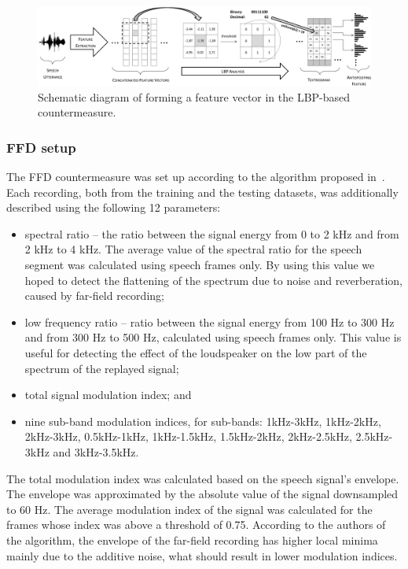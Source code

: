 
\begin{figure}
	\includegraphics[width=1\linewidth]{Figs/LBPfeature.pdf}

	\caption{Schematic diagram of forming a feature vector in the LBP-based countermeasure.}
	\label{fig:LBPfeature}
\end{figure}


\subsubsection{FFD setup} The FFD countermeasure was set up according to the algorithm proposed in~\cite{Villalba2011}. Each recording, both from the training and the testing datasets, was additionally described using the following 12 parameters:
\begin{itemize}
\item spectral ratio -- the ratio between
the signal energy from 0 to 2 kHz and from 2 kHz to 4 kHz.  The average value of the spectral ratio for the speech segment was calculated using speech frames only. By using this value we hoped to detect the flattening of the spectrum due to noise and reverberation, caused by far-field recording;
\item low frequency ratio -- ratio between the signal energy from 100 Hz to 300 Hz and from 300 Hz to 500 Hz, calculated using speech frames only. This value is useful for detecting the effect of the loudspeaker on the low part of the spectrum of the replayed signal;
\item total signal modulation index; and
\item nine sub-band modulation indices, for sub-bands: 1kHz-3kHz, 1kHz-2kHz,
2kHz-3kHz, 0.5kHz-1kHz, 1kHz-1.5kHz, 1.5kHz-2kHz, 2kHz-2.5kHz, 2.5kHz-3kHz and 3kHz-3.5kHz.
\end{itemize}

The total modulation index was calculated based on the speech signal's envelope. The envelope was approximated by the absolute value of the signal downsampled to 60 Hz. The average modulation index of the signal was calculated for
the frames whose index was above a threshold of 0.75. According to the authors of the algorithm, the envelope of the far-field recording has higher local minima mainly due to the additive noise, what should result in lower modulation indices. 


